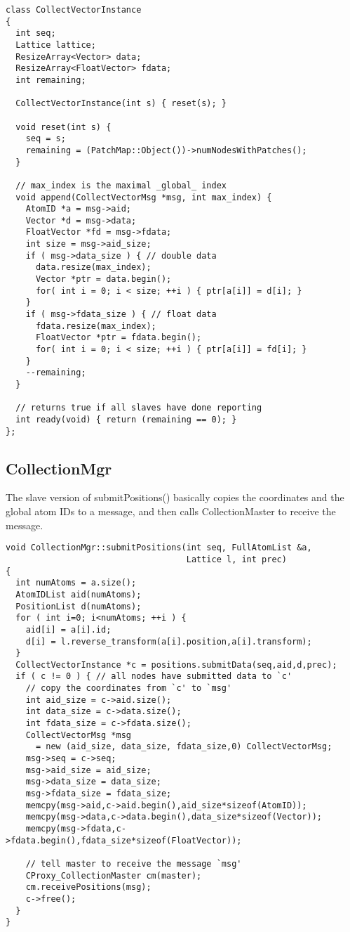 \documentclass{article}
\begin{document}
\begin{lstlisting}
class CollectVectorInstance
{
  int seq;
  Lattice lattice;
  ResizeArray<Vector> data;
  ResizeArray<FloatVector> fdata;
  int remaining;

  CollectVectorInstance(int s) { reset(s); }

  void reset(int s) {
    seq = s;
    remaining = (PatchMap::Object())->numNodesWithPatches();
  }

  // max_index is the maximal _global_ index
  void append(CollectVectorMsg *msg, int max_index) {
    AtomID *a = msg->aid;
    Vector *d = msg->data;
    FloatVector *fd = msg->fdata;
    int size = msg->aid_size;
    if ( msg->data_size ) { // double data
      data.resize(max_index);
      Vector *ptr = data.begin();
      for( int i = 0; i < size; ++i ) { ptr[a[i]] = d[i]; }
    }
    if ( msg->fdata_size ) { // float data
      fdata.resize(max_index);
      FloatVector *ptr = fdata.begin();
      for( int i = 0; i < size; ++i ) { ptr[a[i]] = fd[i]; }
    }
    --remaining;
  }

  // returns true if all slaves have done reporting
  int ready(void) { return (remaining == 0); }
};
\end{lstlisting}



\subsection{CollectionMgr}




The slave version of submitPositions() basically
copies the coordinates and the global atom IDs to
a message, and then calls CollectionMaster to receive the message.
%
\begin{lstlisting}
void CollectionMgr::submitPositions(int seq, FullAtomList &a,
                                    Lattice l, int prec)
{
  int numAtoms = a.size();
  AtomIDList aid(numAtoms);
  PositionList d(numAtoms);
  for ( int i=0; i<numAtoms; ++i ) {
    aid[i] = a[i].id;
    d[i] = l.reverse_transform(a[i].position,a[i].transform);
  }
  CollectVectorInstance *c = positions.submitData(seq,aid,d,prec);
  if ( c != 0 ) { // all nodes have submitted data to `c'
    // copy the coordinates from `c' to `msg'
    int aid_size = c->aid.size();
    int data_size = c->data.size();
    int fdata_size = c->fdata.size();
    CollectVectorMsg *msg
      = new (aid_size, data_size, fdata_size,0) CollectVectorMsg;
    msg->seq = c->seq;
    msg->aid_size = aid_size;
    msg->data_size = data_size;
    msg->fdata_size = fdata_size;
    memcpy(msg->aid,c->aid.begin(),aid_size*sizeof(AtomID));
    memcpy(msg->data,c->data.begin(),data_size*sizeof(Vector));
    memcpy(msg->fdata,c->fdata.begin(),fdata_size*sizeof(FloatVector));

    // tell master to receive the message `msg'
    CProxy_CollectionMaster cm(master);
    cm.receivePositions(msg);
    c->free();
  }
}
\end{lstlisting}
\end{document}
